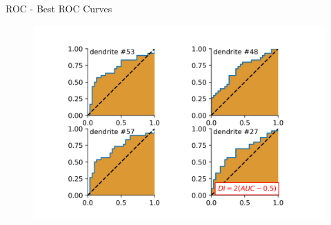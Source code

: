 \documentclass[10pt]{beamer}
\begin{document}
\begin{frame}[fragile]{ROC - Best ROC Curves}
\begin{center}
	\begin{figure}
      \includegraphics[width=1.0\textwidth]{roc_four.png}
	\end{figure}
	\end{center}
\end{frame}

%
\end{document}
